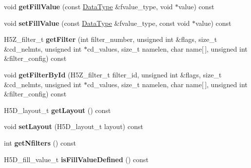 \begin{DoxyCompactItemize}
void {\bfseries get\+Fill\+Value} (const \hyperlink{class_h5_1_1_data_type}{Data\+Type} \&fvalue\+\_\+type, void $\ast$value) const
\item 
\mbox{\label{class_h5_1_1_d_set_creat_prop_list_ad477b0730376b8aabd47adbed0100933}} 
void {\bfseries set\+Fill\+Value} (const \hyperlink{class_h5_1_1_data_type}{Data\+Type} \&fvalue\+\_\+type, const void $\ast$value) const
\item 
\mbox{\label{class_h5_1_1_d_set_creat_prop_list_af6d8744d98f251f7a8f94df64f2405ef}} 
H5\+Z\+\_\+filter\+\_\+t {\bfseries get\+Filter} (int filter\+\_\+number, unsigned int \&flags, size\+\_\+t \&cd\+\_\+nelmts, unsigned int $\ast$cd\+\_\+values, size\+\_\+t namelen, char name\mbox{[}$\,$\mbox{]}, unsigned int \&filter\+\_\+config) const
\item 
\mbox{\label{class_h5_1_1_d_set_creat_prop_list_abb6f29fbcfbc70aef28f96e1962ac778}} 
void {\bfseries get\+Filter\+By\+Id} (H5\+Z\+\_\+filter\+\_\+t filter\+\_\+id, unsigned int \&flags, size\+\_\+t \&cd\+\_\+nelmts, unsigned int $\ast$cd\+\_\+values, size\+\_\+t namelen, char name\mbox{[}$\,$\mbox{]}, unsigned int \&filter\+\_\+config) const
\item 
\mbox{\label{class_h5_1_1_d_set_creat_prop_list_a17a333e1cc6dabbf2c71c80758fa8bbc}} 
H5\+D\+\_\+layout\+\_\+t {\bfseries get\+Layout} () const
\item 
\mbox{\label{class_h5_1_1_d_set_creat_prop_list_aa3648a39bc43389187e1a372999a77d5}} 
void {\bfseries set\+Layout} (H5\+D\+\_\+layout\+\_\+t layout) const
\item 
\mbox{\label{class_h5_1_1_d_set_creat_prop_list_ada589ef31aee1e6e0c60c4ac1bbf0d4b}} 
int {\bfseries get\+Nfilters} () const
\item 
\mbox{\label{class_h5_1_1_d_set_creat_prop_list_a592f4ce06302bd3a0965457d6e16fb93}} 
H5\+D\+\_\+fill\+\_\+value\+\_\+t {\bfseries is\+Fill\+Value\+Defined} () const
\item 
\mbox{\label{class_h5_1_1_d_set_creat_prop_list_a8529f28494b63f3d90206bcb94ddd1e8}} 

\end{DoxyCompactItemize}
